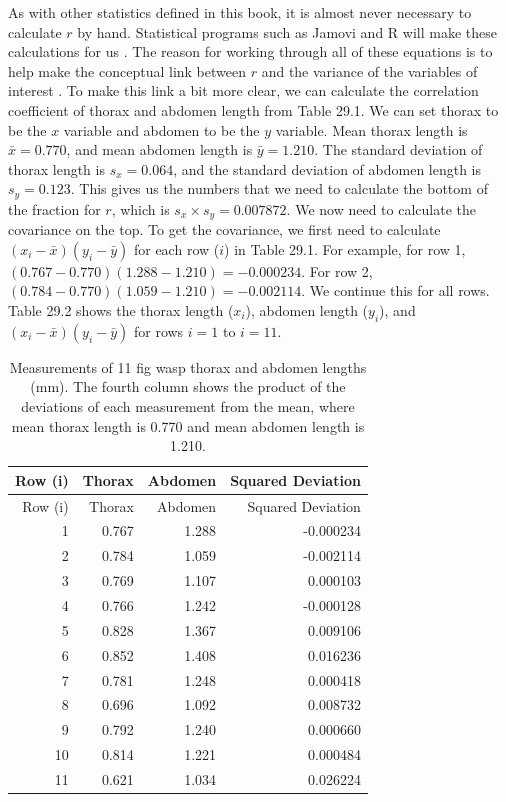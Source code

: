\documentclass[
]{scrbook}
\begin{document}
As with other statistics defined in this book, it is almost never necessary to calculate \(r\) by hand.
Statistical programs such as Jamovi and R will make these calculations for us \citep{Jamovi2022, Rproject}.
The reason for working through all of these equations is to help make the conceptual link between \(r\) and the variance of the variables of interest \citep{Rodgers1988}.
To make this link a bit more clear, we can calculate the correlation coefficient of thorax and abdomen length from Table 29.1.
We can set thorax to be the \(x\) variable and abdomen to be the \(y\) variable.
Mean thorax length is \(\bar{x} = 0.770\), and mean abdomen length is \(\bar{y} = 1.210\).
The standard deviation of thorax length is \(s_{x} = 0.064\), and the standard deviation of abdomen length is \(s_{y} = 0.123\).
This gives us the numbers that we need to calculate the bottom of the fraction for \(r\), which is \(s_{x} \times s_{y} = 0.007872\).
We now need to calculate the covariance on the top.
To get the covariance, we first need to calculate \(\left(x_{i} - \bar{x} \right) \left(y_{i} - \bar{y} \right)\) for each row (\(i\)) in Table 29.1.
For example, for row 1, \(\left(0.767 - 0.770\right) \left(1.288 - 1.210\right) = -0.000234.\)
For row 2, \(\left(0.784 - 0.770\right) \left(1.059 - 1.210\right) = -0.002114.\)
We continue this for all rows.
Table 29.2 shows the thorax length (\(x_{i}\)), abdomen length (\(y_{i}\)), and \(\left(x_{i} - \bar{x} \right) \left(y_{i} - \bar{y} \right)\) for rows \(i = 1\) to \(i = 11\).

\begin{longtable}[]{@{}rrrr@{}}
\caption{\label{tab:unnamed-chunk-147}Measurements of 11 fig wasp thorax and abdomen lengths (mm). The fourth column shows the product of the deviations of each measurement from the mean, where mean thorax length is 0.770 and mean abdomen length is 1.210.}\tabularnewline
\toprule
Row (i) & Thorax & Abdomen & Squared Deviation \\
\midrule
\endfirsthead
\toprule
Row (i) & Thorax & Abdomen & Squared Deviation \\
\midrule
\endhead
1 & 0.767 & 1.288 & -0.000234 \\
2 & 0.784 & 1.059 & -0.002114 \\
3 & 0.769 & 1.107 & 0.000103 \\
4 & 0.766 & 1.242 & -0.000128 \\
5 & 0.828 & 1.367 & 0.009106 \\
6 & 0.852 & 1.408 & 0.016236 \\
7 & 0.781 & 1.248 & 0.000418 \\
8 & 0.696 & 1.092 & 0.008732 \\
9 & 0.792 & 1.240 & 0.000660 \\
10 & 0.814 & 1.221 & 0.000484 \\
11 & 0.621 & 1.034 & 0.026224 \\
\bottomrule
\end{longtable}
\end{document}
